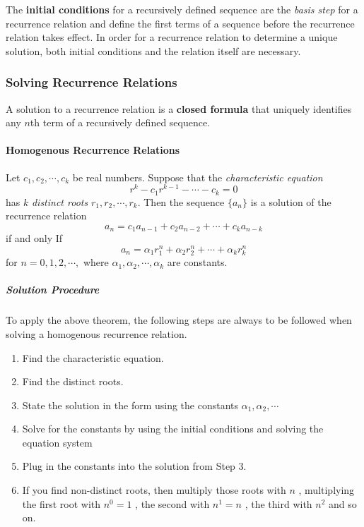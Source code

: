 The \textbf{initial conditions} for a recursively defined sequence are the \emph{basis step} for a recurrence relation and define the first terms of a sequence before the recurrence relation takes effect. In order for a recurrence relation to determine a unique solution, both initial conditions and the relation itself are necessary.

\subsubsection{Solving Recurrence Relations}
A solution to a recurrence relation is a \textbf{closed formula} that uniquely identifies any \(n\)th term of a recursively defined sequence.

\paragraph{Homogenous Recurrence Relations}
Let \( c_1,c_2, \cdots , c_k \) be real numbers. Suppose that the \emph{characteristic equation} \[
r^k - c_1r^{k-1} - \cdots - c_k = 0
\]
has \( k \) \emph{distinct roots} \( r_1,r_2, \cdots, r_k \). Then the sequence \( \{a_n\} \) is a solution of the recurrence relation \[
a_n = c_1a_{n-1} + c_2a_{n-2} + \cdots + c_k a_{n-k}
\]  
if and only If
\[
a_n = \alpha_1 r^n_1 + \alpha_2 r_2^n+ \cdots + \alpha_k r_k^n
\]
for \( n = 0,1,2, \cdots , \) where \( \alpha_1, \alpha_2, \cdots , \alpha_k \) are constants. 

\subparagraph{Solution Procedure} To apply the above theorem, the following steps are always to be followed when solving a homogenous recurrence relation.

\begin{enumerate}
	\item Find the characteristic equation.
	\item Find the distinct roots.
	\item State the solution in the form using the constants \( \alpha_1, \alpha_2, \cdots \)
	\item Solve for the constants by using the initial conditions and solving the equation system
	\item Plug in the constants into the solution from Step 3.
	\item If you find non-distinct roots, then multiply those roots with \( n \) , multiplying the first root with \( n^0 = 1\) , the second with \( n^1 =n \) , the third with \( n^2 \)  and so on.
\end{enumerate}

